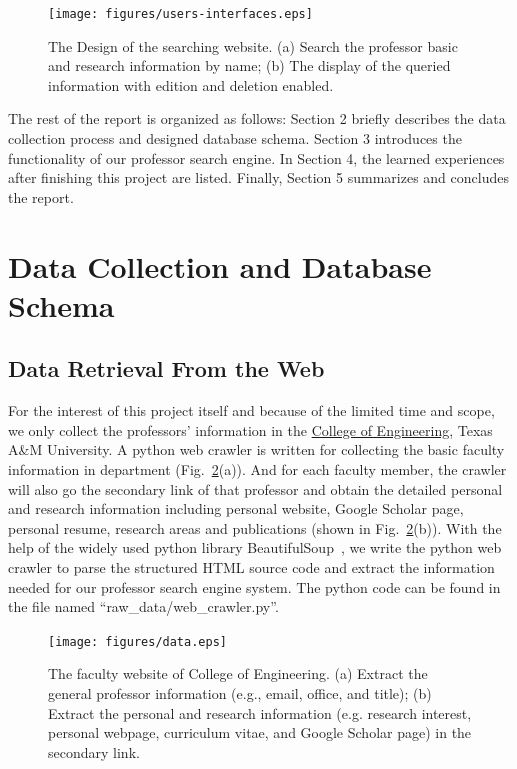 \documentclass[authoryear,preprint,final,12pt]{elsarticle}
\begin{document}
\begin{figure}[H]
\centering
 \texttt{[image: figures/users-interfaces.eps]}
 \caption{The Design of the searching website. (a) Search the professor basic and research information by name; (b) The display of the queried information with edition and deletion enabled.}
 \label{extract}
\end{figure}

The rest of the report is organized as follows: Section 2 briefly describes the data collection process and designed database schema. Section 3 introduces the functionality of our professor search engine. In Section 4, the learned experiences after finishing this project are listed. Finally, Section 5 summarizes and concludes the report. 


\section{Data Collection and Database Schema}
\subsection{Data Retrieval From the Web}
For the interest of this project itself and because of the limited time and scope, we only collect the professors' information in the \href{http://engineering.tamu.edu/academics/departments}{College of Engineering}, Texas A\&M University. A python web crawler is written for collecting the basic faculty information in department (Fig.~\ref{data}(a)). And for each faculty member, the crawler will also go the secondary link of that professor and obtain the detailed personal and research information including personal website, Google Scholar page, personal resume, research areas and publications (shown in Fig.~\ref{data}(b)). With the help of the widely used python library BeautifulSoup~\cite{bs}, we write the python web crawler to parse the structured HTML source code and extract the information needed for our professor search engine system. The python code can be found in the file named ``raw\_data/web\_crawler.py''.

\begin{figure}[H]
\centering
 \texttt{[image: figures/data.eps]}
 \caption{The faculty website of College of Engineering. (a) Extract the general professor information (e.g., email, office, and title); (b) Extract the personal and research information (e.g. research interest, personal webpage, curriculum vitae, and Google Scholar page) in the secondary link.}
 \label{data}
\end{figure}
\end{document}
